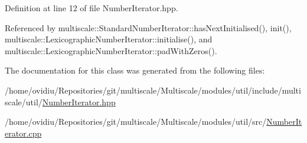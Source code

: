 Definition at line 12 of file Number\-Iterator.\-hpp.



Referenced by multiscale\-::\-Standard\-Number\-Iterator\-::has\-Next\-Initialised(), init(), multiscale\-::\-Lexicographic\-Number\-Iterator\-::initialise(), and multiscale\-::\-Lexicographic\-Number\-Iterator\-::pad\-With\-Zeros().



The documentation for this class was generated from the following files\-:\begin{DoxyCompactItemize}
\item 
/home/ovidiu/\-Repositories/git/multiscale/\-Multiscale/modules/util/include/multiscale/util/\hyperlink{NumberIterator_8hpp}{Number\-Iterator.\-hpp}\item 
/home/ovidiu/\-Repositories/git/multiscale/\-Multiscale/modules/util/src/\hyperlink{NumberIterator_8cpp}{Number\-Iterator.\-cpp}\end{DoxyCompactItemize}
